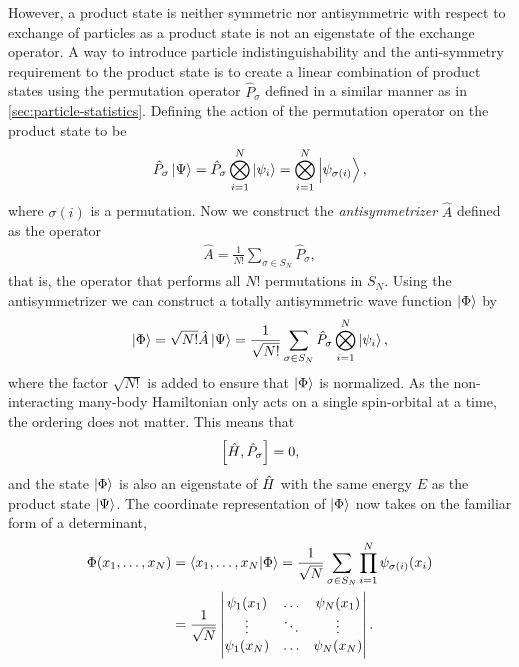         However, a product state is neither symmetric nor antisymmetric with
        respect to exchange of particles as a product state is not an eigenstate
        of the exchange operator.
        A way to introduce particle indistinguishability and the anti-symmetry
        requirement to the product state is to create a linear combination of
        product states using the permutation operator $\hat{P}_{\sigma}$ defined
        in a similar manner as in \autoref{sec:particle-statistics}.
        Defining the action of the permutation operator on the product state to
        be
        \begin{align}
            \hat{P}_{\sigma}\ket{\Psi}
            = \hat{P}_{\sigma}\bigotimes_{i = 1}^{N}\ket{\psi_i}
            = \bigotimes_{i = 1}^{N}\ket{\psi_{\sigma(i)}},
        \end{align}
        where $\sigma(i)$ is a permutation.
        Now we construct the \emph{antisymmetrizer} $\hat{A}$ defined as the
        operator
        \begin{align}
            \hat{A} = \frac{1}{N!}\sum_{\sigma \in S_{N}}\hat{P}_{\sigma},
        \end{align}
        that is, the operator that performs all $N!$ permutations in $S_{N}$.
        Using the antisymmetrizer we can construct a totally antisymmetric wave
        function $\ket{\Phi}$ by
        \begin{align}
            \ket{\Phi}
            = \sqrt{N!}\hat{A}\ket{\Psi}
            = \frac{1}{\sqrt{N!}}\sum_{\sigma \in S_{N}}
            \hat{P}_{\sigma}
            \bigotimes_{i = 1}^{N}\ket{\psi_i},
            \label{eq:slater-determinant-abstract}
        \end{align}
        where the factor $\sqrt{N!}$ is added to ensure that $\ket{\Phi}$ is
        normalized.
        As the non-interacting many-body Hamiltonian only acts on a single
        spin-orbital at a time, the ordering does not matter.
        This means that
        \begin{align}
            \left[\hat{H}, \hat{P}_{\sigma}\right] = 0,
        \end{align}
        and the state $\ket{\Phi}$ is also an eigenstate of $\hat{H}$ with the
        same energy $E$ as the product state $\ket{\Psi}$.
        The coordinate representation of $\ket{\Phi}$ now takes on the familiar
        form of a determinant,
        \begin{align}
            \Phi(x_1, \dots, x_N)
            &=
            \braket{x_1, \dots, x_N}{\Phi}
            = \frac{1}{\sqrt{N}}
            \sum_{\sigma \in S_{N}}
            \prod_{i = 1}^{N}
            \psi_{\sigma(i)}(x_i)
            \\
            &=
            \frac{1}{\sqrt{N}}
            \begin{vmatrix}
                \psi_1(x_1) & \dots & \psi_N(x_1) \\
                \vdots & \ddots & \vdots \\
                \psi_1(x_N) & \dots & \psi_N(x_N)
            \end{vmatrix}.
            \label{eq:coord_slater}
        \end{align}
